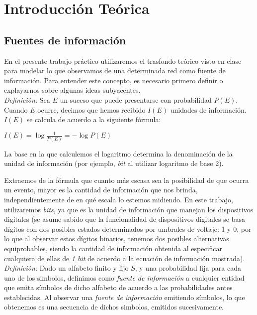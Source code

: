 \section{Introducción Teórica}

\subsection{Fuentes de información}

En el presente trabajo práctico utilizaremos el trasfondo teórico visto en clase para modelar lo que
observamos de una determinada red como fuente de información. Para entender este concepto,
es necesario primero definir o explayarnos sobre algunas ideas subyacentes.\\

\emph{Definición:} Sea $E$ un suceso que puede presentarse con probabilidad $P(E)$. Cuando $E$ ocurre,
decimos que hemos recibido $I(E)$ unidades de información.
$I(E)$ se calcula de acuerdo a la siguiente fórmula:

\begin{center}
\begin{math}
I(E) = \log{\frac{1}{P(E)}} = -\log{P(E)}
\end{math}
\end{center}

La base en la que calculemos el logaritmo determina la denominación de la unidad de información (por ejemplo, \emph{bit} al utilizar logaritmo de base 2).

Extraemos de la fórmula que cuanto más escasa sea la posibilidad de que ocurra un evento, mayor es la cantidad de 
información que nos brinda, independientemente de en qué escala lo estemos midiendo. En este trabajo, utilizaremos
\emph{bits}, ya que es la unidad de información que manejan los dispositivos digitales (se asume sabido que la funcionalidad
de dispositivos digitales se basa dígitos con dos posibles estados determinados por umbrales de voltaje: 1 y 0, por lo que al observar
estos dígitos binarios, tenemos dos posibles alternativas equiprobables, siendo la cantidad de información obtenida al
especificar cualquiera de ellas de \emph{1 bit} de acuerdo a la ecuación de información mostrada).\\

\emph{Definición:} Dado un alfabeto finito y fijo $S$, y una probabilidad fija para cada uno de los simbolos, definimos como \emph{fuente de información} a cualquier entidad que emita símbolos de dicho alfabeto de acuerdo a las probabilidades antes establecidas. Al
observar una \emph{fuente de información} emitiendo símbolos, lo que obtenemos es una secuencia de dichos simbolos,
emitidos sucesivamente.\\ 


